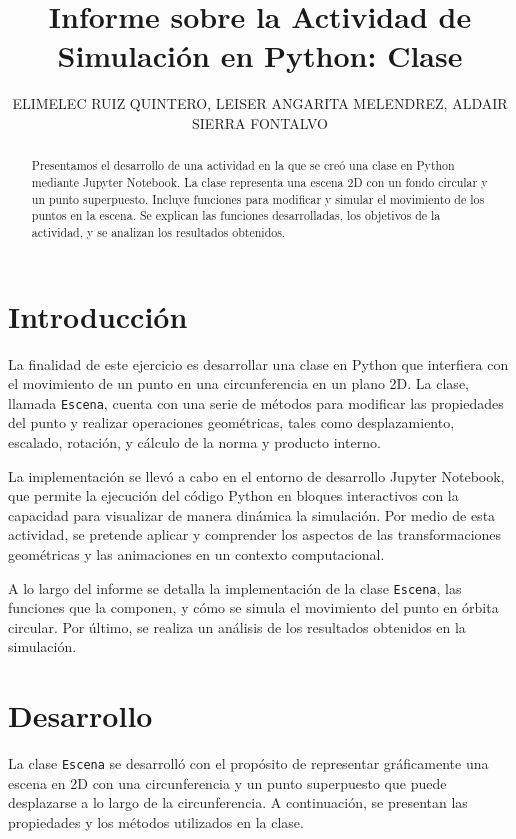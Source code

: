 \title{Informe sobre la Actividad de Simulación en Python: Clase}
\author{ELIMELEC RUIZ QUINTERO, LEISER ANGARITA MELENDREZ, ALDAIR SIERRA FONTALVO}

\maketitle

\begin{abstract}
  Presentamos el desarrollo de una actividad en la que se creó una clase en Python mediante Jupyter Notebook. La clase representa una escena 2D con un fondo circular y un punto superpuesto. Incluye funciones para modificar y simular el movimiento de los puntos en la escena. Se explican las funciones desarrolladas, los objetivos de la actividad, y se analizan los resultados obtenidos.
\end{abstract}

\section{Introducción}
La finalidad de este ejercicio es desarrollar una clase en Python que interfiera con el movimiento de un punto en una circunferencia en un plano 2D. La clase, llamada \texttt{Escena}, cuenta con una serie de métodos para modificar las propiedades del punto y realizar operaciones geométricas, tales como desplazamiento, escalado, rotación, y cálculo de la norma y producto interno.

La implementación se llevó a cabo en el entorno de desarrollo Jupyter Notebook, que permite la ejecución del código Python en bloques interactivos con la capacidad para visualizar de manera dinámica la simulación. Por medio de esta actividad, se pretende aplicar y comprender los aspectos de las transformaciones geométricas y las animaciones en un contexto computacional.

A lo largo del informe se detalla la implementación de la clase \texttt{Escena}, las funciones que la componen, y cómo se simula el movimiento del punto en órbita circular. Por último, se realiza un análisis de los resultados obtenidos en la simulación.

\section{Desarrollo}
La clase \texttt{Escena} se desarrolló con el propósito de representar gráficamente una escena en 2D con una circunferencia y un punto superpuesto que puede desplazarse a lo largo de la circunferencia. A continuación, se presentan las propiedades y los métodos utilizados en la clase.

